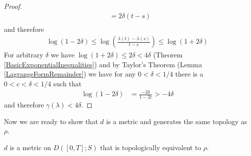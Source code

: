 \begin{proof}
\begin{align*}
&= 2\delta (t-s) \\
\end{align*}
and therefore 
\begin{align*}
\log(1 - 2\delta) \leq \log \left( \frac{\lambda(t) - \lambda(s)}{t-s} \right) \leq \log(1+2\delta)
\end{align*}
For arbitrary $\delta$ we have $\log(1+2\delta) \leq 2\delta < 4 \delta$ (Theorem \ref{BasicExponentialInequalities}) and by 
Taylor's Theorem (Lemma \ref{LagrangeFormRemainder}) we have for any $0 < \delta < 1/4$ there is a $0 < c < \delta < 1/4$ such that
\begin{align*}
\log(1 - 2\delta) &= \frac{-2\delta}{1 - 2c} > -4\delta
\end{align*}
and therefore $\gamma(\lambda) < 4\delta$.
\end{proof}
Now we are ready to show that $d$ is a metric and generates the same topology as $\rho$.
\begin{thm}\label{SkorohodJ1Metric}$d$ is a metric on $D([0,T];S)$ that is topologically equivalent to
  $\rho$.
\end{thm}
